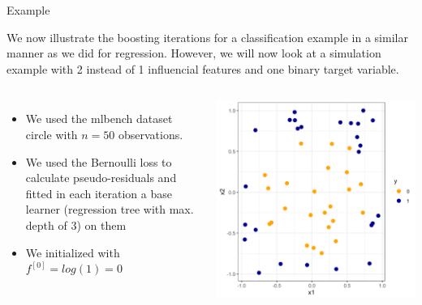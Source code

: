 \begin{vbframe}{Example}

We now illustrate the boosting iterations for a classification example in a similar manner as we did for regression.
However, we will now look at a simulation example with 2 instead of 1 influencial features and one binary target variable.

\begin{columns}
\column{5.5cm}
\begin{itemize}
\item We used the mlbench dataset circle with $n = 50$ observations.
\item We used the Bernoulli loss to calculate pseudo-residuals and fitted in each iteration a base learner (regression tree with max. depth of 3) on them
\item We initialized with $f^{[0]} = log(1) = 0$
\end{itemize}
\column{4.5cm}
\begin{center}
\includegraphics[width=\textwidth]{figure_man/boosting_classif_example.png}
\end{center}

\end{columns}



\end{vbframe}

